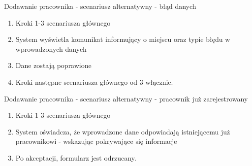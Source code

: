 	Dodawanie pracownika - scenariusz alternatywny - błąd danych
	\begin{enumerate}
	  \item Kroki 1-3 scenariusza głównego
	  \item System wyświetla komunikat informujący o miejscu oraz typie błędu w
	  wprowadzonych danych
	  \item Dane zostają poprawione
	  \item Kroki następne scenariusza głównego od 3 włącznie.
	\end{enumerate}
	
	Dodawanie pracownika - scenariusz alternatywny - pracownik już zarejestrowany
	\begin{enumerate}
	  \item Kroki 1-3 scenariusza głównego
	  \item System oświadcza, że wprowadzone dane odpowiadają istniejącemu już
	  pracownikowi - wskazując pokrywające się informacje
	  \item Po akceptacji, formularz jest odrzucany.
	\end{enumerate}
